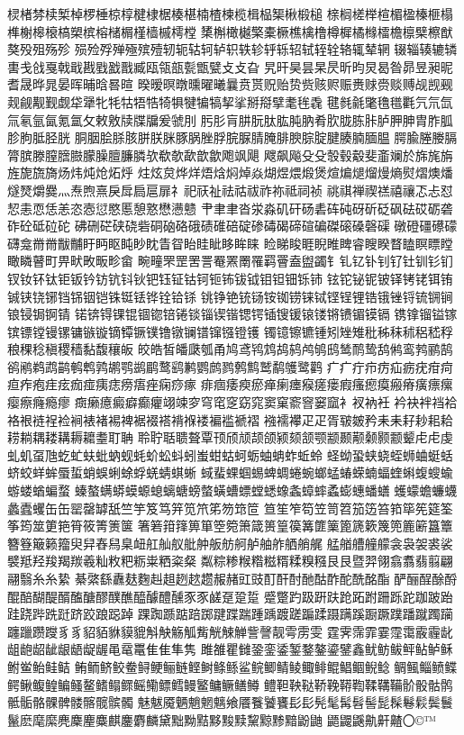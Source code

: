 棂楮棼椟椠棹椤棰椋椁楗棣椐楱椹楠楂楝榄楫榀榘楸椴槌
榇榈槎榉楦楣楹榛榧榻榫榭槔榱槁槊槟榕槠榍槿樯槭樗樘
橥槲橄樾檠橐橛樵檎橹樽樨橘橼檑檐檩檗檫猷獒殁殂殇殄
殒殓殍殚殛殡殪轫轭轱轲轳轵轶轸轷轹轺轼轾辁辂辄辇辋
辍辎辏辘辚軎戋戗戛戟戢戡戥戤戬臧瓯瓴瓿甏甑甓⽁攴旮
旯旰昊昙杲昃昕昀炅曷昝昴昱昶昵耆晟晔晁晏晖晡晗晷暄
暌暧暝暾曛曜曦曩贲贳贶贻贽赀赅赆赈赉赇赍赕赙觇觊觋
觌觎觏觐觑牮犟牝牦牯牾牿犄犋犍犏犒挈挲掰搿擘耄毪毳
毽毵毹氅氇氆氍氕氘氙氚氡氩氤氪氲攵敕敫牍牒牖爰虢刖
肟肜肓肼朊肽肱肫肭肴肷胧胨胩胪胛胂胄胙胍胗朐胝胫胱
胴胭脍脎胲胼朕脒豚脶脞脬脘脲腈腌腓腴腙腚腱腠腩腼腽
腭腧塍媵膈膂膑滕膣膪臌朦臊膻臁膦欤欷欹歃歆歙飑飒飓
飕飙飚⽎殳彀毂觳斐齑斓於旆旄旃旌旎旒旖炀炜炖炝炻烀
炷炫炱烨烊焐焓焖焯焱煳煜煨煅煲煊煸煺熘熳熵熨熠燠燔
燧燹爝爨灬焘煦熹戾戽扃扈扉礻祀祆祉祛祜祓祚祢祗祠祯
祧祺禅禊禚禧禳忑忐怼恝恚恧恁恙恣悫愆愍慝憩憝懋懑戆
肀⾀聿沓泶淼矶矸砀砉砗砘砑斫砭砜砝砹砺砻砟砼砥砬砣
砩硎硭硖硗砦硐硇硌硪碛碓碚碇碜碡碣碲碹碥磔磙磉磬磲
礅磴礓礤礞礴龛⿋黹黻黼盱眄眍盹眇眈眚眢眙眭眦眵眸睐
睑睇睃睚睨睢睥睿瞍睽瞀瞌瞑瞟瞠瞰瞵瞽町畀畎畋畈畛畲
畹疃罘罡罟詈罨罴罱罹羁罾盍盥蠲钅钆钇钋钊钌钍钏钐钔
钗钕钚钛钜钣钤钫钪钭钬钯钰钲钴钶钷钸钹钺钼钽钿铄铈
铉铊铋铌铍铎铐铑铒铕铖铗铙铘铛铞铟铠铢铤铥铧铨铪铩
铫铮铯铳铴铵铷铹铼铽铿锃锂锆锇锉锊锍锎锏锒锓锔锕锖
锘锛锝锞锟锢锪锫锩锬锱锲锴锶锷锸锼锾锿镂锵镄镅镆镉
镌镎镏镒镓镔镖镗镘镙镛镞镟镝镡镢镤镥镦镧镨镩镪镫镬
镯镱镲镳锺矧矬雉秕秭秣秫稆嵇稃稂稞稔稹稷穑黏馥穰皈
皎皓皙皤瓞瓠甬鸠鸢鸨鸩鸪鸫鸬鸲鸱鸶鸸鸷鸹鸺鸾鹁鹂鹄
鹆鹇鹈鹉鹋鹌鹎鹑鹕鹗鹚鹛鹜鹞鹣鹦鹧鹨鹩鹪鹫鹬鹱鹭鹳
⽧疒疔疖疠疝疬疣疳疴疸痄疱疰痃痂痖痍痣痨痦痤痫痧瘃
痱痼痿瘐瘀瘅瘌瘗瘊瘥瘘瘕瘙瘛瘼瘢瘠癀瘭瘰瘿瘵癃瘾瘳
癍癞癔癜癖癫癯翊竦穸穹窀窆窈窕窦窠窬窨窭窳衤衩衲衽
衿袂袢裆袷袼裉裢裎裣裥裱褚裼裨裾裰褡褙褓褛褊褴褫褶
襁襦襻⽦疋胥皲皴矜⽾耒耔耖耜耠耢耥耦耧耩耨耱耋耵聃
聆聍聒聩聱覃顸颀颃颉颌颍颏颔颚颛颞颟颡颢颥颦⾌虍虔
虬虮虿虺虼虻蚨蚍蚋蚬蚝蚧蚣蚪蚓蚩蚶蛄蚵蛎蚰蚺蚱蚯蛉
蛏蚴蛩蛱蛲蛭蛳蛐蜓蛞蛴蛟蛘蛑蜃蜇蛸蜈蜊蜍蜉蜣蜻蜞蜥
蜮蜚蜾蝈蜴蜱蜩蜷蜿螂蜢蝽蝾蝻蝠蝰蝌蝮螋蝓蝣蝼蝤蝙蝥
螓螯螨蟒蟆螈螅螭螗螃螫蟥螬螵螳蟋蟓螽蟑蟀蟊蟛蟪蟠蟮
蠖蠓蟾蠊蠛蠡蠹蠼⽸缶罂罄罅舐竺竽笈笃笄笕笊笫笏筇笸
笪笙笮笱笠笥笤笳笾笞筘筚筅筵筌筝筠筮筻筢筲筱箐箦箧
箸箬箝箨箅箪箜箢箫箴篑篁篌篝篚篥篦篪簌篾篼簏簖簋簟
簪簦簸籁籀臾舁舂舄臬衄舡舢舣舭舯舨舫舸舻舳舴舾艄艉
艋艏艚艟艨衾袅袈裘裟襞羝羟羧羯羰羲籼敉粑粝粜粞粢粲
粼粽糁糇糌糍糈糅糗糨⾉艮暨羿翎翕翥翡翦翩翮翳⽷糸絷
綦綮繇纛麸麴赳趄趔趑趱赧赭豇豉酊酐酎酏酤酢酡酰酩酯
酽酾酲酴酹醌醅醐醍醑醢醣醪醭醮醯醵醴醺⾗豕鹾趸跫踅
蹙蹩趵趿趼趺跄跖跗跚跞跎跏跛跆跬跷跸跣跹跻跤踉跽踔
踝踟踬踮踣踯踺蹀踹踵踽踱蹉蹁蹂蹑蹒蹊蹰蹶蹼蹯蹴躅躏
躔躐躜躞⾘豸貂貊貅貘貔斛觖觞觚觜觥觫觯訾謦靓雩雳雯
霆霁霈霏霎霪霭霰霾龀龃龅龆龇龈龉龊龌黾鼋鼍⾫隹隼隽
雎雒瞿雠銎銮鋈錾鍪鏊鎏鐾鑫鱿鲂鲅鲆鲇鲈稣鲋鲎鲐鲑鲒
鲔鲕鲚鲛鲞鲟鲠鲡鲢鲣鲥鲦鲧鲨鲩鲫鲭鲮鲰鲱鲲鲳鲴鲵鲶
鲷鲺鲻鲼鲽鳄鳅鳆鳇鳊鳋鳌鳍鳎鳏鳐鳓鳔鳕鳗鳘鳙鳜鳝鳟
鳢靼鞅鞑鞒鞔鞯鞫鞣鞲鞴骱骰骷鹘骶骺骼髁髀髅髂髋髌髑
魅魃魇魉魈魍魑飨餍餮饕饔⾽髟髡髦髯髫髻髭髹鬈鬏鬓鬟
鬣麽麾縻麂麇麈麋麒鏖麝麟黛黜黝黠黟黢黩黧黥黪黯鼢鼬
鼯鼹鼷鼽鼾齄〇©™

